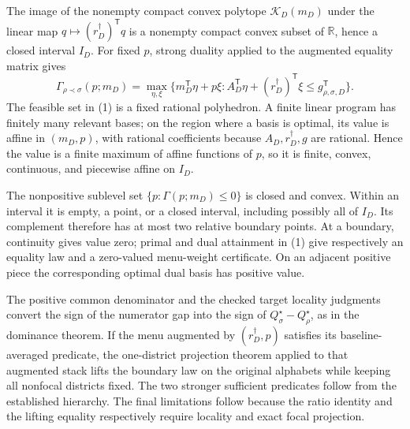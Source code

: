 The image of the nonempty compact convex polytope \(\mathcal K_D(m_D)\) under the linear map \(q\mapsto (r_D^\dagger)^{\mathsf T}q\) is a nonempty compact convex subset of \(\mathbb R\), hence a closed interval \(I_D\).  For fixed \(p\), strong duality applied to the augmented equality matrix gives
\[
\Gamma_{\rho\prec\sigma}(p;m_D)
=\max_{\eta,\xi}
\{m_D^{\mathsf T}\eta+p\xi:
A_D^{\mathsf T}\eta+(r_D^\dagger)^{\mathsf T}\xi
\le g_{\rho,\sigma,D}^{\mathsf T}\}.
\tag{1}
\]
The feasible set in (1) is a fixed rational polyhedron.  A finite linear program has finitely many relevant bases; on the region where a basis is optimal, its value is affine in \((m_D,p)\), with rational coefficients because \(A_D,r_D^\dagger,g\) are rational.  Hence the value is a finite maximum of affine functions of \(p\), so it is finite, convex, continuous, and piecewise affine on \(I_D\).

The nonpositive sublevel set \(\{p:\Gamma(p;m_D)\le0\}\) is closed and convex.  Within an interval it is empty, a point, or a closed interval, including possibly all of \(I_D\).  Its complement therefore has at most two relative boundary points.  At a boundary, continuity gives value zero; primal and dual attainment in (1) give respectively an equality law and a zero-valued menu-weight certificate.  On an adjacent positive piece the corresponding optimal dual basis has positive value.

The positive common denominator and the checked target locality judgments convert the sign of the numerator gap into the sign of \(Q_\sigma^\star-Q_\rho^\star\), as in the dominance theorem.  If the menu augmented by \((r_D^\dagger,p)\) satisfies its baseline-averaged predicate, the one-district projection theorem applied to that augmented stack lifts the boundary law on the original alphabets while keeping all nonfocal districts fixed.  The two stronger sufficient predicates follow from the established hierarchy.  The final limitations follow because the ratio identity and the lifting equality respectively require locality and exact focal projection.